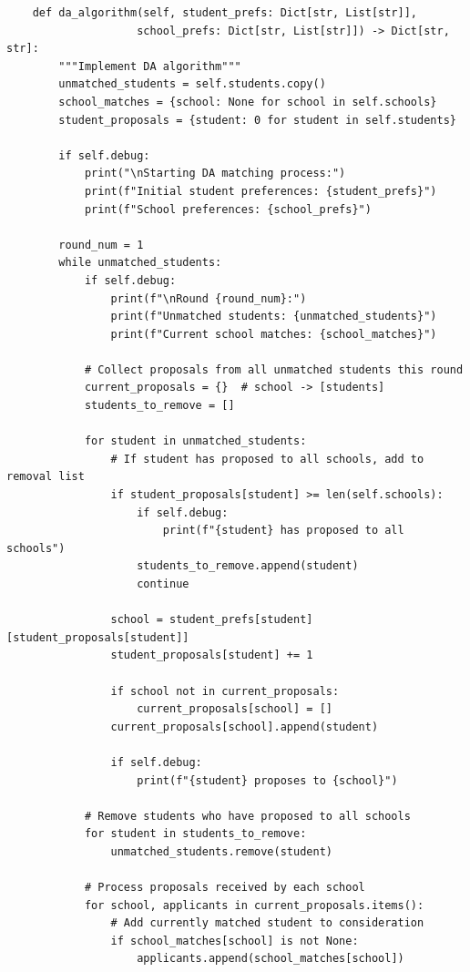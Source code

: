 \documentclass{article}
\begin{document}
\begin{verbatim}
    def da_algorithm(self, student_prefs: Dict[str, List[str]], 
                    school_prefs: Dict[str, List[str]]) -> Dict[str, str]:
        """Implement DA algorithm"""
        unmatched_students = self.students.copy()
        school_matches = {school: None for school in self.schools}
        student_proposals = {student: 0 for student in self.students}
        
        if self.debug:
            print("\nStarting DA matching process:")
            print(f"Initial student preferences: {student_prefs}")
            print(f"School preferences: {school_prefs}")
            
        round_num = 1
        while unmatched_students:
            if self.debug:
                print(f"\nRound {round_num}:")
                print(f"Unmatched students: {unmatched_students}")
                print(f"Current school matches: {school_matches}")
            
            # Collect proposals from all unmatched students this round
            current_proposals = {}  # school -> [students]
            students_to_remove = []
            
            for student in unmatched_students:
                # If student has proposed to all schools, add to removal list
                if student_proposals[student] >= len(self.schools):
                    if self.debug:
                        print(f"{student} has proposed to all schools")
                    students_to_remove.append(student)
                    continue
                    
                school = student_prefs[student][student_proposals[student]]
                student_proposals[student] += 1
                
                if school not in current_proposals:
                    current_proposals[school] = []
                current_proposals[school].append(student)
                
                if self.debug:
                    print(f"{student} proposes to {school}")
            
            # Remove students who have proposed to all schools
            for student in students_to_remove:
                unmatched_students.remove(student)
            
            # Process proposals received by each school
            for school, applicants in current_proposals.items():
                # Add currently matched student to consideration
                if school_matches[school] is not None:
                    applicants.append(school_matches[school])
                

\end{verbatim}
\end{document}
